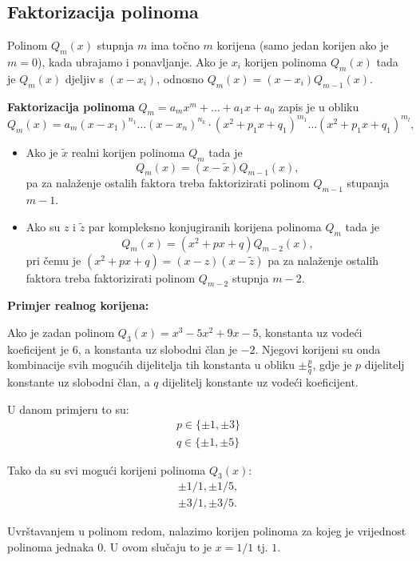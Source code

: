 \subsection{Faktorizacija polinoma}

Polinom $Q_m(x)$ stupnja $m$ ima točno $m$ korijena (samo jedan korijen ako je
$m=0$), kada ubrajamo i ponavljanje. Ako je $x_i$ korijen polinoma $Q_m(x)$ tada
je $Q_m(x)$ djeljiv s $(x-x_i)$, odnosno $Q_m(x) = (x-x_i)Q_{m-1}(x)$.

\textbf{Faktorizacija polinoma} $Q_m=a_mx^m+\dots+a_1x+a_0$ zapis je u obliku
$$
Q_m(x) = a_m(x-x_1)^{n_1}\dots(x-x_n)^{n_k}\cdot(x^2+p_1x+q_1)^{m_1}\dots(x^2+p_1x+q_1)^{m_l},
$$

\begin{itemize}
    \item Ako je $\tilde{x}$ realni korijen polinoma $Q_m$ tada je
    $$
    Q_m(x) = (x-\tilde{x})Q_{m-1}(x),
    $$
    pa za nalaženje ostalih faktora treba faktorizirati polinom $Q_{m-1}$
    stupanja $m-1$.
    \item Ako su $z$ i $\tilde{z}$ par kompleksno konjugiranih korijena polinoma
    $Q_m$ tada je
    $$
    Q_m(x) = (x^2+px+q)Q_{m-2}(x),
    $$
    pri čemu je $(x^2+px+q) = (x-z)(x-\tilde{z})$ pa za nalaženje ostalih
    faktora treba faktorizirati polinom $Q_{m-2}$ stupnja $m-2$.
\end{itemize}

\textbf{Primjer realnog korijena:}

Ako je zadan polinom $Q_3(x) = x^3-5x^2+9x-5$, konstanta uz vodeći koeficijent je 6,
a konstanta uz slobodni član je $-2$. Njegovi korijeni su onda kombinacije svih
mogućih dijelitelja tih konstanta u obliku $\pm\frac{p}{q}$, gdje je $p$
dijelitelj konstante uz slobodni član, a $q$ dijelitelj konstante uz vodeći
koeficijent.

U danom primjeru to su:
\begin{gather*}
p\in\{\pm1, \pm3\}\\
q\in\{\pm1, \pm5\}
\end{gather*}

Tako da su svi mogući korijeni polinoma $Q_3(x)$:
\begin{gather*}
\pm 1/1, \pm 1/5,\\
\pm 3/1, \pm 3/5.
\end{gather*}

Uvrštavanjem u polinom redom, nalazimo korijen polinoma za kojeg je vrijednost
polinoma jednaka $0$. U ovom slučaju to je $x=1/1$ tj. $1$.

